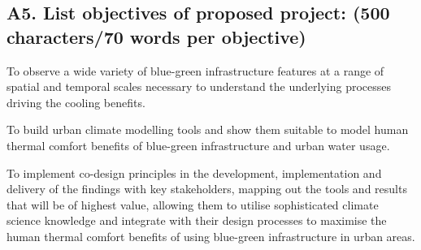 

\subsection*{\TitleFont A5. List objectives of proposed project: (500 characters/70 words per objective) }





To observe a wide variety of blue-green infrastructure features at a range of spatial and temporal scales necessary to understand the underlying processes driving the cooling benefits.

To build urban climate modelling tools and show them suitable to model human thermal comfort benefits of blue-green infrastructure and urban water usage.


To implement co-design principles in the development, implementation and delivery of the findings with key stakeholders, mapping out the tools and results that will be of highest value, allowing them to utilise sophisticated climate science knowledge and integrate with their design processes to maximise the human thermal comfort benefits of using blue-green infrastructure in urban areas.

